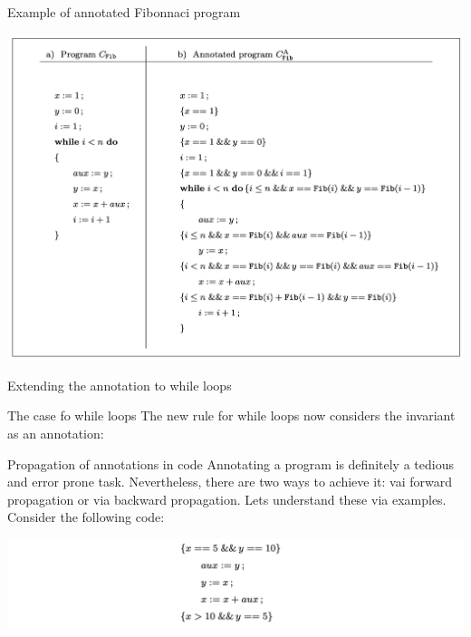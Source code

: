 \documentclass[aspectratio=169]{beamer}
\begin{document}
\begin{slide}{Example of annotated Fibonnaci program}
\begin{center}
\includegraphics[scale=0.3]{images/fib}
\end{center}
\end{slide}

\begin{frame}[fragile]{Extending the annotation to while loops}
  \begin{block}{The case fo while loops}
  The new rule for while loops now considers the invariant as an annotation:
    \begin{prooftree}
    \end{prooftree}
  \end{block}
\end{frame}

\begin{slide}{Propagation of annotations in code}
Annotating a program is definitely a tedious and error prone task. Nevertheless, there are two ways to achieve it: vai forward propagation or via backward propagation. Lets understand these via examples. Consider the following code:
\begin{center}
\includegraphics[scale=0.5]{images/ex_code}  
\end{center}
\end{slide}
\end{document}
